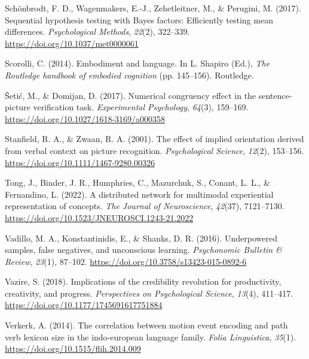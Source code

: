 \documentclass[
  man,floatsintext]{apa7}
\newlength{\cslhangindent}
\newlength{\cslentryspacingunit} %
\newenvironment{CSLReferences}[2] %
 {%
  \setlength{\parindent}{0pt}
  \ifodd #1
  \let\oldpar\par
  \def\par{\hangindent=\cslhangindent\oldpar}
  \fi
  \setlength{\parskip}{#2\cslentryspacingunit}
 }%
 {}
\begin{document}
\begin{CSLReferences}{1}{0}
\leavevmode{}%
Schönbrodt, F. D., Wagenmakers, E.-J., Zehetleitner, M., \& Perugini, M. (2017). Sequential hypothesis testing with {Bayes} factors: {Efficiently} testing mean differences. \emph{Psychological Methods}, \emph{22}(2), 322--339. \url{https://doi.org/10.1037/met0000061}

\leavevmode{}%
Scorolli, C. (2014). Embodiment and language. In L. Shapiro (Ed.), \emph{The {Routledge} handbook of embodied cognition} (pp. 145--156). {Routledge}.

\leavevmode{}%
Šetić, M., \& Domijan, D. (2017). Numerical {congruency effect} in the {sentence-picture verification task}. \emph{Experimental Psychology}, \emph{64}(3), 159--169. \url{https://doi.org/10.1027/1618-3169/a000358}

\leavevmode{}%
Stanfield, R. A., \& Zwaan, R. A. (2001). The effect of implied orientation derived from verbal context on picture recognition. \emph{Psychological Science}, \emph{12}(2), 153--156. \url{https://doi.org/10.1111/1467-9280.00326}

\leavevmode{}%
Tong, J., Binder, J. R., Humphries, C., Mazurchuk, S., Conant, L. L., \& Fernandino, L. (2022). A distributed network for multimodal experiential representation of concepts. \emph{The Journal of Neuroscience}, \emph{42}(37), 7121--7130. \url{https://doi.org/10.1523/JNEUROSCI.1243-21.2022}

\leavevmode{}%
Vadillo, M. A., Konstantinidis, E., \& Shanks, D. R. (2016). Underpowered samples, false negatives, and unconscious learning. \emph{Psychonomic Bulletin \& Review}, \emph{23}(1), 87--102. \url{https://doi.org/10.3758/s13423-015-0892-6}

\leavevmode{}%
Vazire, S. (2018). Implications of the credibility revolution for productivity, creativity, and progress. \emph{Perspectives on Psychological Science}, \emph{13}(4), 411--417. \url{https://doi.org/10.1177/1745691617751884}

\leavevmode{}%
Verkerk, A. (2014). The correlation between motion event encoding and path verb lexicon size in the indo-european language family. \emph{Folia Linguistica}, \emph{35}(1). \url{https://doi.org/10.1515/flih.2014.009}


\end{CSLReferences}
\end{document}
